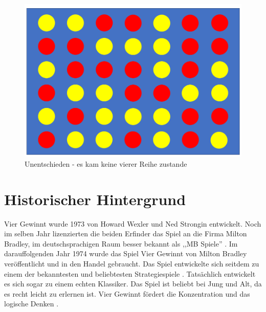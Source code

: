 \begin{figure}[H]
	\centering
	\includegraphics[width=0.8\linewidth]{images/Unentschieden}
	\caption[Unentschieden]{Unentschieden - es kam keine vierer Reihe zustande}
	\label{fig:unentschiedent}
\end{figure}
\newpage
\section{Historischer Hintergrund}

Vier Gewinnt wurde 1973 von Howard Wexler und Ned Strongin entwickelt. Noch im selben Jahr lizenzierten die beiden Erfinder das Spiel an die Firma Milton Bradley, im deutschsprachigen Raum besser bekannt als ,,MB Spiele''
\autocite{gameorama_4gewinnt}\autocite{wikipedia_vier_gewinnt}.
Im darauffolgenden Jahr 1974 wurde das Spiel Vier Gewinnt von Milton Bradley veröffentlicht und in den Handel gebraucht. Das Spiel entwickelte sich seitdem zu einem der bekanntesten und beliebtesten Strategiespiele \autocite{wikipedia_vier_gewinnt}. Tatsächlich entwickelt es sich sogar zu einem echten Klassiker. Das Spiel ist beliebt bei Jung und Alt, da es recht leicht zu erlernen ist. Vier Gewinnt fördert die Konzentration und das logische Denken \autocite{50plus_vier_gewinnt}.

